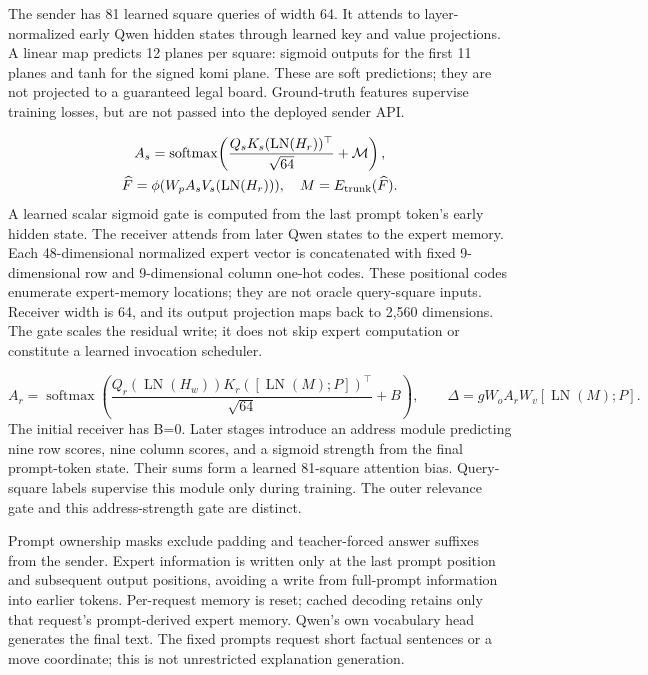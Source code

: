 \documentclass[11pt]{article}
\begin{document}
The sender has 81 learned square queries of width 64. It attends to layer-normalized early Qwen hidden states through learned key and value projections. A linear map predicts 12 planes per square: sigmoid outputs for the first 11 planes and tanh for the signed komi plane. These are soft predictions; they are not projected to a guaranteed legal board. Ground-truth features supervise training losses, but are not passed into the deployed sender API.

\[\begin{gathered}A_s=\operatorname{softmax}\!\left(\frac{Q_s K_s(\operatorname{LN}(H_r))^\top}{\sqrt{64}}+\mathcal{M}\right),\\ \widehat F=\phi(W_p A_s V_s(\operatorname{LN}(H_r))),\quad M=E_{\rm trunk}(\widehat F).\end{gathered}\]
A learned scalar sigmoid gate is computed from the last prompt token's early hidden state. The receiver attends from later Qwen states to the expert memory. Each 48-dimensional normalized expert vector is concatenated with fixed 9-dimensional row and 9-dimensional column one-hot codes. These positional codes enumerate expert-memory locations; they are not oracle query-square inputs. Receiver width is 64, and its output projection maps back to 2,560 dimensions. The gate scales the residual write; it does not skip expert computation or constitute a learned invocation scheduler.

\[A_r=\operatorname{softmax}\!\left(\frac{Q_r(\operatorname{LN}(H_w))K_r([\operatorname{LN}(M);P])^\top}{\sqrt{64}}+B\right),\qquad \Delta=gW_o A_rW_v[\operatorname{LN}(M);P].\]
The initial receiver has B=0. Later stages introduce an address module predicting nine row scores, nine column scores, and a sigmoid strength from the final prompt-token state. Their sums form a learned 81-square attention bias. Query-square labels supervise this module only during training. The outer relevance gate and this address-strength gate are distinct.

Prompt ownership masks exclude padding and teacher-forced answer suffixes from the sender. Expert information is written only at the last prompt position and subsequent output positions, avoiding a write from full-prompt information into earlier tokens. Per-request memory is reset; cached decoding retains only that request's prompt-derived expert memory. Qwen's own vocabulary head generates the final text. The fixed prompts request short factual sentences or a move coordinate; this is not unrestricted explanation generation.
\end{document}
